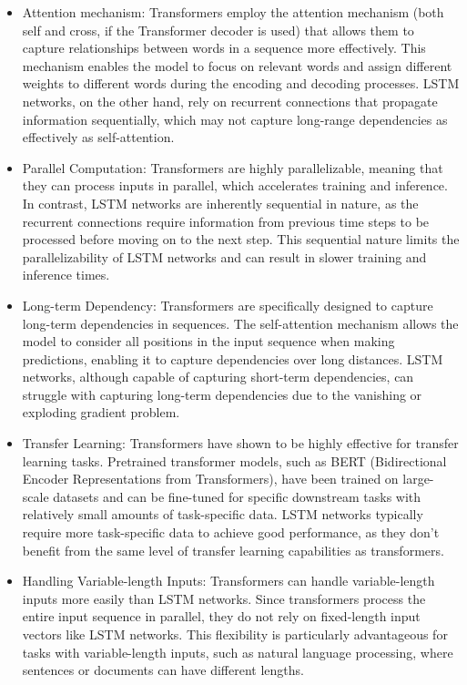 \begin{itemize}
	\item Attention mechanism: Transformers employ the attention mechanism (both self and cross, if the Transformer decoder is used) that allows them to capture relationships between words in a sequence more effectively. This mechanism enables the model to focus on relevant words and assign different weights to different words during the encoding and decoding processes. \ac{LSTM} networks, on the other hand, rely on recurrent connections that propagate information sequentially, which may not capture long-range dependencies as effectively as self-attention.
	
	\item Parallel Computation: Transformers are highly parallelizable, meaning that they can process inputs in parallel, which accelerates training and inference. In contrast, \ac{LSTM} networks are inherently sequential in nature, as the recurrent connections require information from previous time steps to be processed before moving on to the next step. This sequential nature limits the parallelizability of LSTM networks and can result in slower training and inference times.
	
	\item Long-term Dependency: Transformers are specifically designed to capture long-term dependencies in sequences. The self-attention mechanism allows the model to consider all positions in the input sequence when making predictions, enabling it to capture dependencies over long distances. LSTM networks, although capable of capturing short-term dependencies, can struggle with capturing long-term dependencies due to the vanishing or exploding gradient problem.
	
	\item Transfer Learning: Transformers have shown to be highly effective for transfer learning tasks. Pretrained transformer models, such as BERT (Bidirectional Encoder Representations from Transformers), have been trained on large-scale datasets and can be fine-tuned for specific downstream tasks with relatively small amounts of task-specific data. \ac{LSTM} networks typically require more task-specific data to achieve good performance, as they don't benefit from the same level of transfer learning capabilities as transformers.
	
	\item Handling Variable-length Inputs: Transformers can handle variable-length inputs more easily than \ac{LSTM} networks. Since transformers process the entire input sequence in parallel, they do not rely on fixed-length input vectors like \ac{LSTM} networks. This flexibility is particularly advantageous for tasks with variable-length inputs, such as natural language processing, where sentences or documents can have different lengths.
	
\end{itemize}

